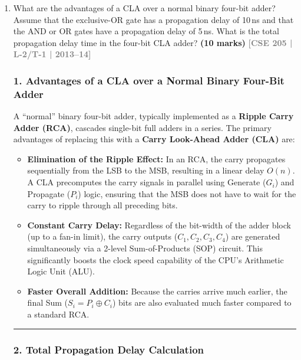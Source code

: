 \documentclass[12pt,a3paper]{article}
\newcommand{\yr}[1]{\hfill\textcolor{gray}{\small\textbf{[#1]}}}
\newcommand{\mk}[1]{\textcolor{orange!70!black}{\small\textbf{(#1 marks)}}}
\begin{document}
\begin{enumerate}
\begin{tcolorbox}[enhanced,breakable,ansbox,colback=cD!4,colframe=cD,boxrule=0.8pt,arc=5pt,title={\textbf{Answer}},fonttitle=\bfseries\color{white},colbacktitle=cD]
\end{tcolorbox}

\item What are the advantages of a CLA over a normal binary four-bit adder? Assume that the exclusive-OR gate has a propagation delay of 10\,ns and that the AND or OR gates have a propagation delay of 5\,ns. What is the total propagation delay time in the four-bit CLA adder?
\mk{10} \yr{CSE 205 | L-2/T-1 | 2013--14}

\begin{tcolorbox}[enhanced,breakable,ansbox,colback=cD!4,colframe=cD,boxrule=0.8pt,arc=5pt,title={\textbf{Answer}},fonttitle=\bfseries\color{white},colbacktitle=cD]

\subsubsection*{1. Advantages of a CLA over a Normal Binary Four-Bit Adder}

A ``normal'' binary four-bit adder, typically implemented as a \textbf{Ripple Carry Adder (RCA)}, cascades single-bit full adders in a series. The primary advantages of replacing this with a \textbf{Carry Look-Ahead Adder (CLA)} are:

\begin{itemize}
    \item \textbf{Elimination of the Ripple Effect:} In an RCA, the carry propagates sequentially from the LSB to the MSB, resulting in a linear delay $O(n)$. A CLA precomputes the carry signals in parallel using Generate ($G_i$) and Propagate ($P_i$) logic, ensuring that the MSB does not have to wait for the carry to ripple through all preceding bits.
    \item \textbf{Constant Carry Delay:} Regardless of the bit-width of the adder block (up to a fan-in limit), the carry outputs ($C_1, C_2, C_3, C_4$) are generated simultaneously via a 2-level Sum-of-Products (SOP) circuit. This significantly boosts the clock speed capability of the CPU's Arithmetic Logic Unit (ALU).
    \item \textbf{Faster Overall Addition:} Because the carries arrive much earlier, the final Sum ($S_i = P_i \oplus C_i$) bits are also evaluated much faster compared to a standard RCA.
\end{itemize}

\vspace{0.3cm}
\hrule
\vspace{0.3cm}

\subsubsection*{2. Total Propagation Delay Calculation}


\end{tcolorbox}
\end{enumerate}
\end{document}
